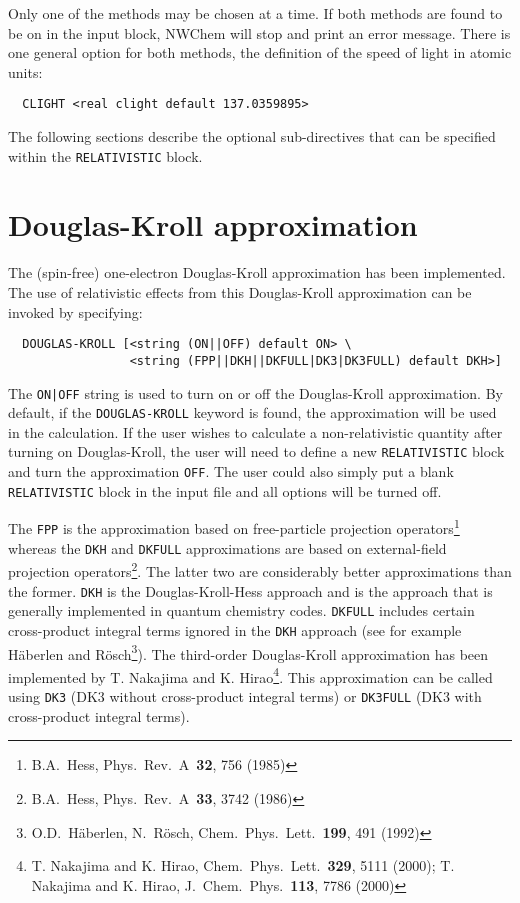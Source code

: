 Only one of the methods may be chosen at a time.  If both methods are found
to be on in the input block, NWChem will stop and print an error message.
There is one general option for both methods, the definition of the speed 
of light in atomic units:

\begin{verbatim}
  CLIGHT <real clight default 137.0359895>
\end{verbatim}

The following sections describe the optional sub-directives that
can be specified within the \verb+RELATIVISTIC+ block.

\section{Douglas-Kroll approximation}
\label{sec:douglas-kroll}


The (spin-free) one-electron Douglas-Kroll approximation has been
implemented. The use of relativistic effects from this Douglas-Kroll
approximation can be invoked by specifying:

\begin{verbatim}
  DOUGLAS-KROLL [<string (ON||OFF) default ON> \
                 <string (FPP||DKH||DKFULL|DK3|DK3FULL) default DKH>]
\end{verbatim}

The \verb+ON|OFF+ string is used to turn on or off the
Douglas-Kroll approximation.  By default, if the \verb+DOUGLAS-KROLL+
keyword is found, the approximation will be used in the calculation.
If the user wishes to calculate a non-relativistic quantity after turning
on Douglas-Kroll, the user will need to define a new \verb+RELATIVISTIC+
block and turn the approximation \verb+OFF+.  The user could also simply
put a blank \verb+RELATIVISTIC+ block in the input file and all options 
will be turned off.

The \verb+FPP+ is the approximation based on free-particle projection 
operators\footnote{B.A.~Hess, Phys.~Rev.~A~{\bf 32}, 756 (1985)} whereas the 
\verb+DKH+ and \verb+DKFULL+ approximations are based on external-field 
projection operators\footnote{B.A.~Hess, Phys.~Rev.~A~{\bf 33}, 3742 (1986)}.
The latter two are considerably better approximations than the former. \verb+DKH+ 
is the Douglas-Kroll-Hess approach and is the approach that is generally 
implemented in quantum chemistry codes. \verb+DKFULL+ includes certain 
cross-product integral terms ignored in the \verb+DKH+ approach (see for example 
H\"{a}berlen and R\"{o}sch\footnote{O.D.~H\"{a}berlen, N.~R\"{o}sch, 
Chem.~Phys.~Lett.~{\bf 199}, 491 (1992)}). The third-order Douglas-Kroll 
approximation has been implemented by T. Nakajima and K. Hirao\footnote{T. Nakajima 
and K. Hirao, Chem.~Phys.~Lett.~{\bf 329}, 5111 (2000); T. Nakajima and K. Hirao, 
J.~Chem.~Phys.~{\bf 113}, 7786 (2000)}. This approximation can be called using
\verb+DK3+ (DK3 without cross-product integral terms) or \verb+DK3FULL+ (DK3 with
cross-product integral terms).

